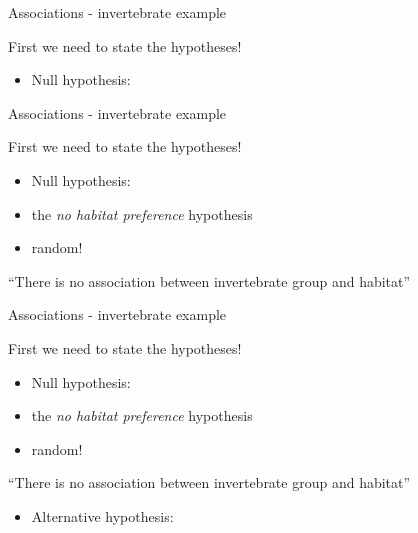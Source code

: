 \documentclass[
  ignorenonframetext,
  t]{beamer}
\providecommand{\tightlist}{%
  \setlength{\itemsep}{0pt}\setlength{\parskip}{0pt}}
\begin{document}
\begin{frame}{Associations - invertebrate example}
\protect\hypertarget{associations---invertebrate-example-1}{}

First we need to state the hypotheses!

\begin{itemize}
\tightlist
\item
  Null hypothesis:
\end{itemize}


\end{frame}

\begin{frame}{Associations - invertebrate example}
\protect\hypertarget{associations---invertebrate-example-2}{}

First we need to state the hypotheses!

\begin{itemize}
\tightlist
\item
  Null hypothesis:
\item
  the \emph{no habitat preference} hypothesis
\item
  random!
\end{itemize}

``There is no association between invertebrate group and habitat''

\end{frame}

\begin{frame}{Associations - invertebrate example}
\protect\hypertarget{associations---invertebrate-example-3}{}

First we need to state the hypotheses!

\begin{itemize}
\tightlist
\item
  Null hypothesis:
\item
  the \emph{no habitat preference} hypothesis
\item
  random!
\end{itemize}

``There is no association between invertebrate group and habitat''

\vspace{0.5cm}

\begin{itemize}
\tightlist
\item
  Alternative hypothesis:
\end{itemize}


\end{frame}
\end{document}
